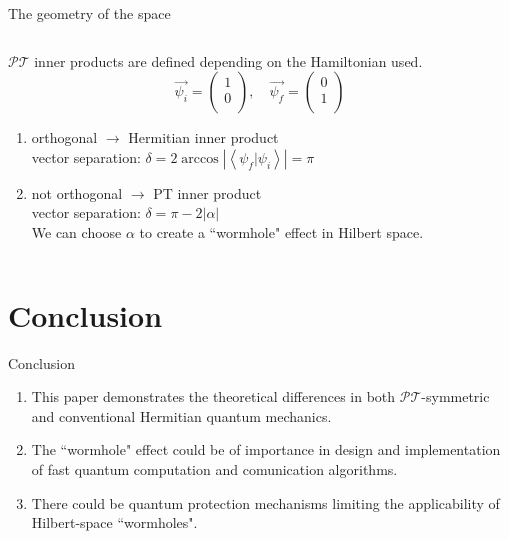 \documentclass[10pt]{beamer}
\begin{document}
\begin{frame}{The geometry of the space}
\begin{columns}
    \hspace{1.5em}
    \begin{column}{\textwidth}
    $\mathcal{PT}$ inner products are defined depending on the Hamiltonian used.\\
    \pause
    \vspace{0.5cm}
    \begin{equation*}
        \vec{\psi_i} = \begin{pmatrix}
                1 \\
                0 \\                
        \end{pmatrix}, \quad
        \vec{\psi_f} = \begin{pmatrix}
                0 \\
                1 \\                
        \end{pmatrix}
        \end{equation*}
    \begin{enumerate}
        \item orthogonal $\to$ \textcolor{myNewColorA}{Hermitian} inner product\\
        \pause
        vector separation: $\delta = 2 \arccos{|\left< \psi_{f}| \psi_{i}\right>|} = \pi$\\
        \pause 
        \item not orthogonal $\to$ \textcolor{myNewColorC}{PT}  inner  product\\
        \pause
        vector separation: $\delta = \pi - 2|\alpha|$\\
        \pause 
        \vspace{0.5cm}
        We can choose $\alpha$ to create a ``wormhole" effect in Hilbert space.
        \end{enumerate}
    \end{column}
\end{columns}
\end{frame}

\section{Conclusion}
\begin{frame}{Conclusion}
\begin{enumerate}
    \item This paper demonstrates the theoretical differences in both $\mathcal{PT}$-symmetric and conventional Hermitian quantum mechanics.\\
    \item The ``wormhole" effect could be of importance in design and implementation of fast quantum computation and comunication algorithms.\\
    \item There could be quantum protection mechanisms limiting the applicability of Hilbert-space ``wormholes".
\end{enumerate}
\end{frame}
\end{document}
